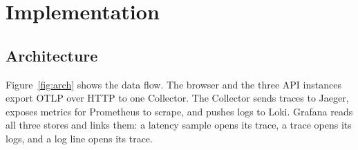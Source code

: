 \documentclass[11pt,a4paper]{article}
\begin{document}
\section{Implementation}
\label{sec:impl}

\subsection{Architecture}
Figure~\ref{fig:arch} shows the data flow. The browser and the three API instances export OTLP
over HTTP to one Collector. The Collector sends traces to Jaeger, exposes metrics for Prometheus
to scrape, and pushes logs to Loki. Grafana reads all three stores and links them: a latency
sample opens its trace, a trace opens its logs, and a log line opens its trace.
\end{document}
